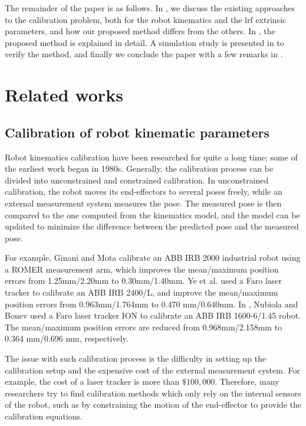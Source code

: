 The remainder of the paper is as follows. In , we discuss the existing approaches to the calibration problem, both for the robot kinematics and the \ac{lrf} extrinsic parameters, and how our proposed method differs from the others. In , the proposed method is explained in detail. A simulation study is presented in  to verify the method, and finally we conclude the paper with a few remarks in .  

\section{Related works}
\label{sec:related}
\subsection{Calibration of robot kinematic parameters}
\label{sec:kine_calib}
Robot kinematics calibration have been researched for quite a long time; some of the earliest work began in 1980s. Generally, the calibration process can be divided into unconstrained and constrained calibration. In unconstrained calibration, the robot moves its end-effectors to several poses freely, while an external measurement system measures the pose. The measured pose is then compared to the one computed from the kinematics model, and the model can be updated to minimize the difference between the predicted pose and the measured pose. 

For example, Ginani and Mota \cite{Ginani2011} calibrate an ABB IRB 2000 industrial robot using a ROMER measurement arm, which improves the mean/maximum position errors from 1.25mm/2.20mm to 0.30mm/1.40mm. Ye et al. \cite{Ye2006} used a Faro laser tracker to calibrate an ABB IRB 2400/L, and improve the mean/maximum position errors from 0.963mm/1.764mm to 0.470 mm/0.640mm. In \cite{Nubiola2013}, Nubiola and Bonev used a Faro laser tracker ION to calibrate an ABB IRB 1600-6/1.45 robot. The mean/maximum position errors are reduced from 0.968mm/2.158mm to 0.364 mm/0.696 mm, respectively.

The issue with such calibration process is the difficulty in setting up the calibration setup and the expensive cost of the external measurement system. For example, the cost of a laser tracker is more than $\$100,000$\cite{Nubiola2013}. Therefore, many researchers try to find calibration methods which only rely on the internal sensors of the robot, such as by constraining the motion of the end-effector to provide the calibration equations. 

